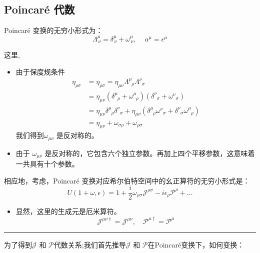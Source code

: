 
\subsection{Poincar\'e 代数}
Poincar\'e 变换的无穷小形式为：
\begin{equation}
    \Lambda^\mu_{\,\nu}=\delta^\mu_{\,\nu}+\omega^\mu_{\,\nu},\quad\,a^\mu=\epsilon^\mu
\end{equation}

这里,\begin{itemize}
    \item 由于保度规条件
    \[\begin{aligned}
        \eta_{\rho\sigma}&= \eta_{\rho\sigma}=\eta_{\mu\nu}\Lambda^\mu_{\;\;\rho}\Lambda^\nu_{\;\;\sigma}\\
        &=\eta_{\mu\nu}(\delta^\mu_{\;\;\rho}+\omega^\mu_{\;\;\rho})(\delta^\nu_{\;\;\sigma}+\omega^\nu_{\;\;\sigma})\\
        &=\eta_{\mu\nu}\delta^\mu_{\;\;\rho}\delta^\nu_{\;\;\sigma}+\eta_{\mu\nu}(\delta^\mu_{\;\;\rho}\omega^\nu_{\;\;\sigma}+\delta^\nu_{\;\;\sigma}\omega^\mu_{\;\;\rho})\\
        &=\eta_{\mu\nu}+\omega_{\sigma\rho}+\omega_{\rho\sigma}
    \end{aligned}\]
    我们得到\(\omega_{\mu\nu}\) 是反对称的。
    \item 由于 \(\omega_{\mu\nu}\) 是反对称的，它包含六个独立参数。再加上四个平移参数，这意味着
     一共具有十个参数。
\end{itemize}
\noindent
相应地，考虑，Poincar\'e 变换对应希尔伯特空间中的幺正算符的无穷小形式是：
\begin{equation}
    {U}(1+\omega,\epsilon)={1}+\frac{i}{2}\omega_{\rho\sigma}\mathscr{J}^{\rho\sigma}-i\epsilon_\rho \mathscr{P}^\rho+\ldots
\end{equation}
\begin{itemize}
    \item 显然，这里的生成元是厄米算符。
    \[\mathscr{J}^{\mu\nu\dagger}= \mathscr{J}^{\mu\nu},\quad \mathscr{P}^{\mu\dagger}=\mathscr{P}^\mu\]
\end{itemize}
\hrule
\vspace{2ex}
为了得到\(\mathscr{J}\) 和 \(\mathscr{P}\)代数关系;我们首先推导\(\mathscr{J}\) 和 \(\mathscr{P}\)在Poincar\'e变换下，如何变换：


